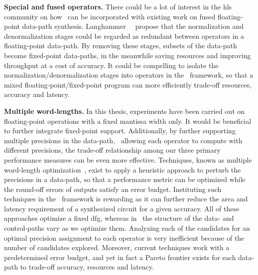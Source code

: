 \textbf{Special and fused operators.} There could be a lot of interest in the
\gls{hls} community on how \soap~can be incorporated with existing work on
fused floating-point data-path synthesis.  Langhammer~\etal~\cite{langhammer}
propose that the normalization and denormalization stages could be regarded
as redundant between operators in a floating-point data-path.  By removing
these stages, subsets of the data-path become fixed-point data-paths, in the
meanwhile saving resources and improving throughput at a cost of accuracy.  It
could be compelling to isolate the normalization/denormalization stages into
operators in the \soap~framework, so that a mixed floating-point/fixed-point
program can more efficiently trade-off resources, accuracy and latency.

\textbf{Multiple word-lengths.}  In this thesis, experiments have been carried
out on floating-point operations with a fixed mantissa width only.  It would be
beneficial to further integrate fixed-point support.  Additionally, by further
supporting multiple precisions in the data-path, \ie~allowing each operator
to compute with different precisions, the trade-off relationship among our
three primary performance measures can be even more effective.  Techniques,
known as multiple word-length optimization~\cite{constantinides, lee06,
cantin02}, exist to apply a heuristic approach to perturb the precisions in a
data-path, so that a performance metric can be optimized while the round-off
errors of outputs satisfy an error budget.  Instituting such techniques in the
\soap~framework is rewarding as it can further reduce the area and latency
requirement of a synthesized circuit for a given accuracy.  All of these
approaches optimize a fixed \acrlong{dfg}, whereas in \soap~the structure
of the data- and control-paths vary as we optimize them.  Analyzing each of
the candidates for an optimal precision assignment to each operator is very
inefficient because of the number of candidates explored.  Moreover, current
techniques work with a predetermined error budget, and yet in fact a Pareto
frontier exists for each data-path to trade-off accuracy, resources and
latency.

